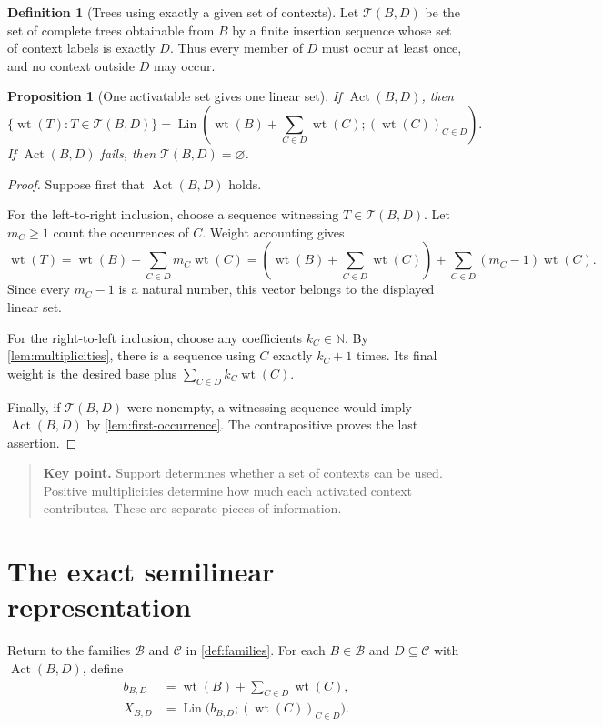 \documentclass[11pt,a4paper]{article}
\numberwithin{equation}{section}
\theoremstyle{plain}
\newtheorem{proposition}[theorem]{Proposition}
\theoremstyle{definition}
\newtheorem{definition}[theorem]{Definition}
\theoremstyle{remark}
\newcommand{\N}{\mathbb N}
\newcommand{\wt}{\operatorname{wt}}
\newcommand{\Lin}{\operatorname{Lin}}
\newcommand{\Act}{\operatorname{Act}}
\newcommand{\Trees}{\mathcal T}
\newcommand{\Bases}{\mathcal B}
\newcommand{\Cycles}{\mathcal C}
\newcommand{\key}[1]{\begin{quote}\small\color{ink}\textbf{Key point.} #1\end{quote}}
\begin{document}
\begin{definition}[Trees using exactly a given set of contexts]
Let $\Trees(B,D)$ be the set of complete trees obtainable from $B$ by a finite insertion sequence whose set of context labels is exactly $D$. Thus every member of $D$ must occur at least once, and no context outside $D$ may occur.
\end{definition}

\begin{proposition}[One activatable set gives one linear set]\label{prop:one-linear}
If $\Act(B,D)$, then
\begin{equation}\label{eq:one-linear}
\{\wt(T):T\in\Trees(B,D)\}
=\Lin\left(\wt(B)+\sum_{C\in D}\wt(C);(\wt(C))_{C\in D}\right).
\end{equation}
If $\Act(B,D)$ fails, then $\Trees(B,D)=\varnothing$.
\end{proposition}
\begin{proof}
Suppose first that $\Act(B,D)$ holds.

For the left-to-right inclusion, choose a sequence witnessing $T\in\Trees(B,D)$. Let $m_C\geq1$ count the occurrences of $C$. Weight accounting gives
\[
\wt(T)=\wt(B)+\sum_{C\in D}m_C\wt(C)
=\left(\wt(B)+\sum_{C\in D}\wt(C)\right)
 +\sum_{C\in D}(m_C-1)\wt(C).
\]
Since every $m_C-1$ is a natural number, this vector belongs to the displayed linear set.

For the right-to-left inclusion, choose any coefficients $k_C\in\N$. By \cref{lem:multiplicities}, there is a sequence using $C$ exactly $k_C+1$ times. Its final weight is the desired base plus $\sum_{C\in D}k_C\wt(C)$.

Finally, if $\Trees(B,D)$ were nonempty, a witnessing sequence would imply $\Act(B,D)$ by \cref{lem:first-occurrence}. The contrapositive proves the last assertion.
\end{proof}

\key{Support determines whether a set of contexts can be used. Positive multiplicities determine how much each activated context contributes. These are separate pieces of information.}

\section{The exact semilinear representation}\label{sec:main}

Return to the families $\Bases$ and $\Cycles$ in \cref{def:families}. For each $B\in\Bases$ and $D\subseteq\Cycles$ with $\Act(B,D)$, define
\begin{align}
b_{B,D}&=\wt(B)+\sum_{C\in D}\wt(C),\label{eq:component-base}\\
X_{B,D}&=\Lin\bigl(b_{B,D};(\wt(C))_{C\in D}\bigr).\label{eq:component}
\end{align}
\end{document}
